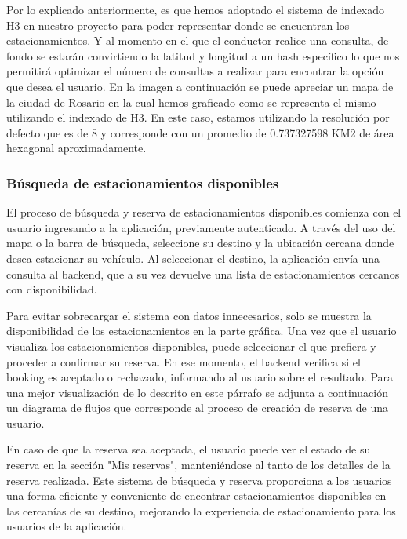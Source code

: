 Por lo explicado anteriormente, es que hemos adoptado el sistema de indexado H3 en nuestro proyecto para poder representar donde se encuentran los estacionamientos. Y al momento en el que el conductor realice una consulta, de fondo se estarán convirtiendo la latitud y longitud a un hash específico lo que nos permitirá optimizar el número de consultas a realizar para encontrar la opción que desea el usuario. En la imagen a continuación se puede apreciar un mapa de la ciudad de Rosario en la cual hemos graficado como se representa el mismo utilizando el indexado de H3. En este caso, estamos utilizando la resolución por defecto que es de 8 y corresponde con un promedio de 0.737327598 KM2 de área hexagonal aproximadamente.

\subsubsection{Búsqueda de estacionamientos disponibles}
El proceso de búsqueda y reserva de estacionamientos disponibles comienza con el usuario ingresando a la aplicación, previamente autenticado. A través del uso del mapa o la barra de búsqueda, seleccione su destino y la ubicación cercana donde desea estacionar su vehículo. Al seleccionar el destino, la aplicación envía una consulta al backend, que a su vez devuelve una lista de estacionamientos cercanos con disponibilidad.

Para evitar sobrecargar el sistema con datos innecesarios, solo se muestra la disponibilidad de los estacionamientos en la parte gráfica. Una vez que el usuario visualiza los estacionamientos disponibles, puede seleccionar el que prefiera y proceder a confirmar su reserva. En ese momento, el backend verifica si el booking es aceptado o rechazado, informando al usuario sobre el resultado. Para una mejor visualización de lo descrito en este párrafo se adjunta a continuación un diagrama de flujos que corresponde al proceso de creación de reserva de una usuario.


En caso de que la reserva sea aceptada, el usuario puede ver el estado de su reserva en la sección "Mis reservas", manteniéndose al tanto de los detalles de la reserva realizada. Este sistema de búsqueda y reserva proporciona a los usuarios una forma eficiente y conveniente de encontrar estacionamientos disponibles en las cercanías de su destino, mejorando la experiencia de estacionamiento para los usuarios de la aplicación.


